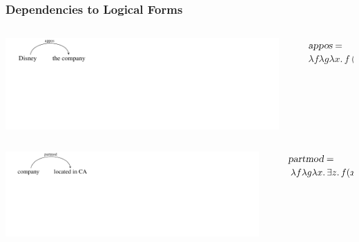 \documentclass[mathserif,12pt]{beamer}
\renewcommand{\land}{\wedge}
\newcommand{\lspace}{.\,}
\begin{document}
\begin{frame}
\frametitle{Dependencies to Logical Forms}
 \vspace{0.6cm}
\begin{columns}
  \begin{column}{0.40\textwidth}
   \centering
  \vspace{-1em}
\includegraphics[trim=1.5em 9em 28em 0em,clip=true,scale=1.3]{figures/appos}   
  \end{column}
    \begin{column}{0.1\textwidth}
  \end{column}
  \begin{column}{0.58\textwidth}
    \large $\textsl{appos}  =$ \\ \hspace{0.5em} $ \lambda f \lambda g \lambda x \lspace f(x) \land g(x)$ \\
  \end{column}
 \end{columns}
 
 \pause
 \vspace{0.6cm}
 \begin{columns}
  \begin{column}{0.39\textwidth}
   \centering
\includegraphics[trim=1.5em 9em 26em 0em,clip=true,scale=1.2]{figures/partmod}
  \end{column}
  \begin{column}{0.1\textwidth}
  \end{column}
  \begin{column}{0.59\textwidth}
\large    $\textsl{partmod}= $ \\ \hspace{0.5em} $\lambda f \lambda g \lambda x \lspace \exists z \lspace f(x) \land g(z) \land \hbox{arg}_2(z_e, x_a)$ 
  \end{column}
  

\end{columns}
\end{frame}
\end{document}

